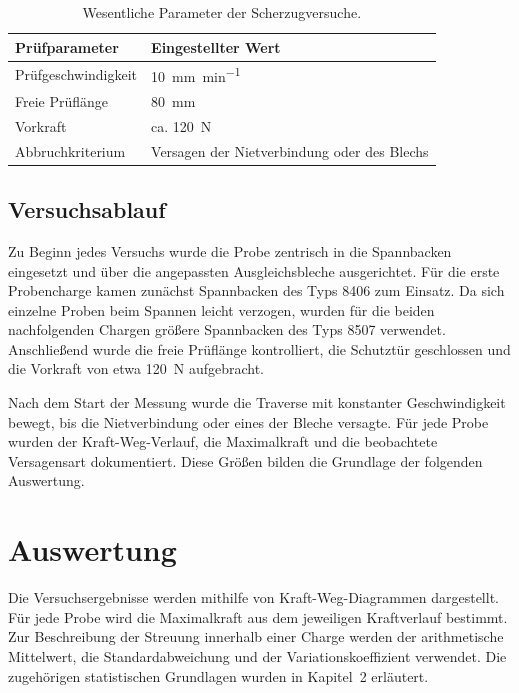 \begin{table}[H]
    \centering
    \caption{Wesentliche Parameter der Scherzugversuche.}
    \label{tab:scherzug_versuchsparameter}
    \begin{tabular}{l l}
        \hline
        Prüfparameter & Eingestellter Wert \\
        \hline
        Prüfgeschwindigkeit & \SI{10}{\milli\metre\per\minute} \\
        Freie Prüflänge & \SI{80}{\milli\metre} \\
        Vorkraft & ca. \SI{120}{\newton} \\
        Abbruchkriterium & Versagen der Nietverbindung oder des Blechs \\
        \hline
    \end{tabular}
\end{table}

	\subsection{Versuchsablauf}
	Zu Beginn jedes Versuchs wurde die Probe zentrisch in die Spannbacken eingesetzt und
über die angepassten Ausgleichsbleche ausgerichtet. Für die erste Probencharge kamen
zunächst Spannbacken des Typs 8406 zum Einsatz. Da sich einzelne Proben beim Spannen
leicht verzogen, wurden für die beiden nachfolgenden Chargen größere Spannbacken des
Typs 8507 verwendet. Anschließend wurde die freie Prüflänge kontrolliert, die
Schutztür geschlossen und die Vorkraft von etwa \SI{120}{\newton} aufgebracht.

Nach dem Start der Messung wurde die Traverse mit konstanter Geschwindigkeit bewegt,
bis die Nietverbindung oder eines der Bleche versagte. Für jede Probe wurden der
Kraft-Weg-Verlauf, die Maximalkraft und die beobachtete Versagensart dokumentiert.
Diese Größen bilden die Grundlage der folgenden Auswertung.

	 \section{Auswertung}
Die Versuchsergebnisse werden mithilfe von Kraft-Weg-Diagrammen dargestellt. Für jede
Probe wird die Maximalkraft aus dem jeweiligen Kraftverlauf bestimmt. Zur Beschreibung
der Streuung innerhalb einer Charge werden der arithmetische Mittelwert, die
Standardabweichung und der Variationskoeffizient verwendet. Die zugehörigen
statistischen Grundlagen wurden in Kapitel~2 erläutert.

\clearpage
